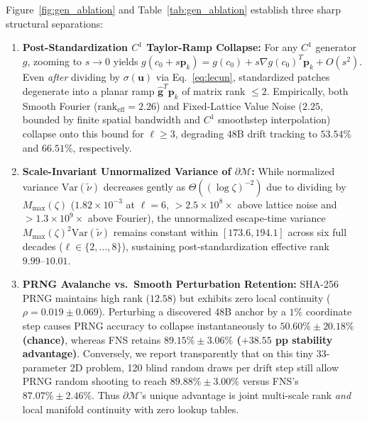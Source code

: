 Figure~\ref{fig:gen_ablation} and Table~\ref{tab:gen_ablation} establish three sharp structural separations:
\begin{enumerate}
    \item \textbf{Post-Standardization $C^1$ Taylor-Ramp Collapse:} For any $C^1$ generator $g$, zooming to $s\to 0$ yields $g(c_0 + s\mathbf{p}_k) = g(c_0) + s\nabla g(c_0)^T\mathbf{p}_k + O(s^2)$. Even \textit{after} dividing by $\sigma(\mathbf{u})$ via Eq.~\eqref{eq:lecun}, standardized patches degenerate into a planar ramp $\hat{\mathbf{g}}^T\mathbf{p}_k$ of matrix rank $\le 2$. Empirically, both Smooth Fourier ($\mathrm{rank}_{\mathrm{eff}} = 2.26$) and Fixed-Lattice Value Noise ($2.25$, bounded by finite spatial bandwidth and $C^1$ smoothstep interpolation) collapse onto this bound for $\ell \ge 3$, degrading 48B drift tracking to $53.54\%$ and $66.51\%$, respectively.
    \item \textbf{Scale-Invariant Unnormalized Variance of $\partial\mathcal{M}$:} While normalized variance $\mathrm{Var}(\tilde{\nu})$ decreases gently as $\Theta((\log\zeta)^{-2})$ due to dividing by $M_{\max}(\zeta)$ ($1.82\times 10^{-3}$ at $\ell=6$, $>2.5\times 10^8\times$ above lattice noise and $>1.3\times 10^9\times$ above Fourier), the unnormalized escape-time variance $M_{\max}(\zeta)^2\mathrm{Var}(\tilde{\nu})$ remains constant within $[173.6, 194.1]$ across six full decades ($\ell\in\{2,\dots,8\}$), sustaining post-standardization effective rank $9.99\text{--}10.01$.
    \item \textbf{PRNG Avalanche vs.\ Smooth Perturbation Retention:} SHA-256 PRNG maintains high rank ($12.58$) but exhibits zero local continuity ($\rho = 0.019\pm 0.069$). Perturbing a discovered 48B anchor by a $1\%$ coordinate step causes PRNG accuracy to collapse instantaneously to \textbf{$50.60\%\pm 20.18\%$ (chance)}, whereas FNS retains \textbf{$89.15\%\pm 3.06\%$ ($+38.55$ pp stability advantage)}. Conversely, we report transparently that on this tiny 33-parameter 2D problem, 120 blind random draws per drift step still allow PRNG random shooting to reach $89.88\%\pm 3.00\%$ versus FNS's $87.07\%\pm 2.46\%$. Thus $\partial\mathcal{M}$'s unique advantage is joint multi-scale rank \textit{and} local manifold continuity with zero lookup tables.
\end{enumerate}


